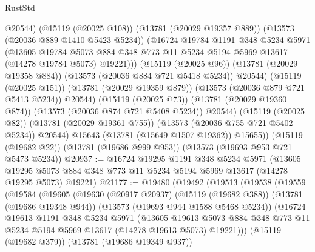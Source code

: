 \begin{lexlean}{RustStd}
\begin{coremodule}
                    @20544)
                  (@15119 (@20025 @108))
                  (@13781 (@20029 @19357 @889))
                  (@13573 (@20036 @889 @1410 @5423 @5234))
                  (@16724
                    @19784
                    @1191
                    @348
                    @5234
                    @5971
                    (@13605
                      @19784
                      @5073
                      @884
                      @348
                      @773
                      @11
                      @5234
                      @5194
                      @5969
                      @13617
                      (@14278 @19784 @5073)
                      @19221)))
                (@15119 (@20025 @96))
                (@13781 (@20029 @19358 @884))
                (@13573 (@20036 @884 @721 @5418 @5234))
                @20544)
              (@15119 (@20025 @151))
              (@13781 (@20029 @19359 @879))
              (@13573 (@20036 @879 @721 @5413 @5234))
              @20544)
            (@15119 (@20025 @73))
            (@13781 (@20029 @19360 @874))
            (@13573 (@20036 @874 @721 @5408 @5234))
            @20544)
          (@15119 (@20025 @82))
          (@13781 (@20029 @19361 @755))
          (@13573 (@20036 @755 @721 @5402 @5234))
          @20544)
        @15643
        (@13781 (@15649 @1507 @19362))
        @15655))
    (@15119 (@19682 @22))
    (@13781 (@19686 @999 @953))
    (@13573 (@19693 @953 @721 @5473 @5234))
@20937 := @16724
    @19295
    @1191
    @348
    @5234
    @5971
    (@13605 @19295 @5073 @884 @348 @773 @11 @5234 @5194 @5969 @13617 (@14278 @19295 @5073) @19221)
@21177 := @19480
    (@19492
      (@19513
        (@19538
          (@19559
            (@19584
              (@19605
                (@19630
                  (@20917 @20937)
                  (@15119 (@19682 @388))
                  (@13781 (@19686 @19348 @944))
                  (@13573 (@19693 @944 @1588 @5468 @5234))
                  (@16724
                    @19613
                    @1191
                    @348
                    @5234
                    @5971
                    (@13605
                      @19613
                      @5073
                      @884
                      @348
                      @773
                      @11
                      @5234
                      @5194
                      @5969
                      @13617
                      (@14278 @19613 @5073)
                      @19221)))
                (@15119 (@19682 @379))
                (@13781 (@19686 @19349 @937))

\end{coremodule}
\end{lexlean}
